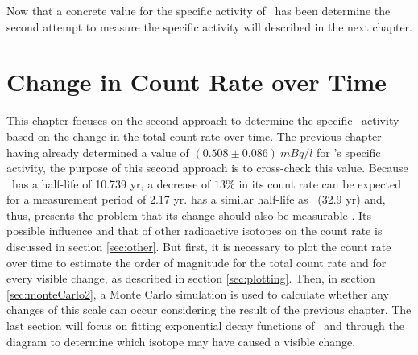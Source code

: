\documentclass[encoding=utf8,british]{tumphthesis}
\begin{document}
Now that a concrete value for the specific activity of \Kr\ has been determine the second attempt to measure the specific activity will described in the next chapter.
\\  
\fi































\chapter{Change in Count Rate over Time}
\label{sec:SAfromDecrease}

This chapter focuses on the second approach to determine the specific \Kr\ activity based on the change in the total count rate over time.
The previous chapter having already determined a value of $(0.508\pm0.086) \ \unit{mBq}/\unit{l}$ for \Kr's specific activity, the purpose of this second approach is to cross-check this value.
Because \Kr\ has a half-life of 10.739 yr, a decrease of $ 13\% $ in its count rate can be expected for a measurement period of 2.17 yr.
 has a similar half-life as \Kr\ (32.9 yr) and, thus, presents the problem that its change should also be measurable \cite{chen_nuclear_2016}.
Its possible influence and that of other radioactive isotopes on the count rate is discussed in section \ref{sec:other}. 
But first, it is necessary to plot the count rate over time to estimate the order of magnitude for the total count rate and for every visible change, as described in section \ref{sec:plotting}.
Then, in section \ref{sec:monteCarlo2}, a Monte Carlo simulation is used to calculate whether any changes of this scale can occur considering the result of the previous chapter.
The last section will focus on fitting exponential decay functions of \Kr\ and  through the diagram to determine which isotope may have caused a visible change.   
\\
\end{document}
